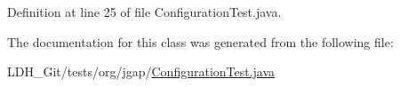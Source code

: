 Definition at line 25 of file Configuration\-Test.\-java.



The documentation for this class was generated from the following file\-:\begin{DoxyCompactItemize}
\item 
L\-D\-H\-\_\-\-Git/tests/org/jgap/\hyperlink{_configuration_test_8java}{Configuration\-Test.\-java}\end{DoxyCompactItemize}
